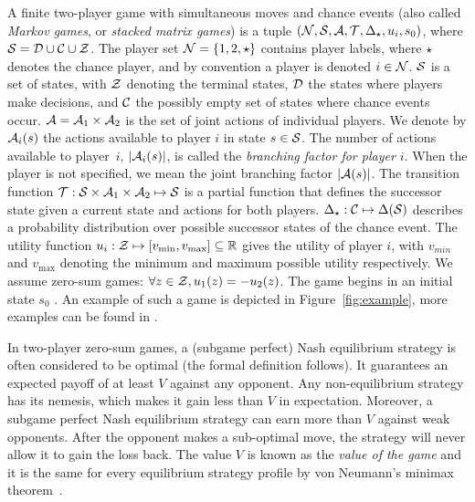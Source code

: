 A finite two-player game with simultaneous moves and chance events (also called \emph{Markov games}, or \emph{stacked matrix games}) is a tuple $(\mathcal{N}, \mathcal{S}, \mathcal{A}, \mathcal{T}, \Delta_\star, u_i, s_0)$, where $\mathcal{S} = \mathcal{D}\cup\mathcal{C}\cup\mathcal{Z}$.
The player set $\mathcal{N} = \{ 1, 2, \star \}$ contains player labels, where
$\star$ denotes the chance player, and by convention a player is denoted $i \in \mathcal{N}$.
$\mathcal{S}$ is a set of states, with $\mathcal{Z}$ denoting the terminal states, $\mathcal{D}$ the states where players make decisions,
and $\mathcal{C}$ the possibly empty set of states where chance events occur. $\mathcal{A} = \mathcal{A}_1 \times \mathcal{A}_2$ is the set of
joint actions of individual players. 
We denote by $\mathcal{A}_i(s)$ the actions available to player $i$ in state $s \in \mathcal{S}$. 
The number of actions available to player~$i$, $|\mathcal{A}_i(s)|$, is called the \emph{branching factor for player $i$}. 
When the player is not specified, we mean the joint branching factor $|\mathcal{A}(s)|$.
The transition function $\mathcal{T} : \mathcal{S} \times \mathcal{A}_1 \times \mathcal{A}_2 \mapsto \mathcal{S}$ is a partial function that defines the successor state given a current
state and actions for both players. $\Delta_\star:\mathcal{C} \mapsto \Delta(\mathcal{S})$ describes a probability distribution over
possible successor states of the chance event.
The utility function $u_i : \mathcal{Z} \mapsto [v_{\min}, v_{\max}] \subseteq \mathbb{R}$ gives the utility of player $i$, with
$v_{min}$ and $v_{\max}$ denoting the minimum and maximum possible utility respectively. We assume zero-sum
games: $\forall z \in \mathcal{Z}, u_1(z) = -u_2(z)$. 
The game begins in an initial state $s_0$ .
An example of such a game is depicted in Figure~\ref{fig:example}, more examples can be found in \cite[Chapter 5]{Saffidine2013thesis}.

In two-player zero-sum games, a (subgame perfect) Nash equilibrium strategy is often considered to be optimal (the formal definition follows).
It guarantees an expected payoff of at least $V$ against any opponent. Any non-equilibrium strategy has its nemesis, which makes it gain less
than $V$ in expectation. Moreover, a subgame perfect Nash equilibrium strategy can earn more than $V$ against weak opponents. After the
opponent makes a sub-optimal move, the strategy will never allow it to gain the loss back.
The value $V$ is known as the \emph{value of the game} and it is the same for every equilibrium strategy profile by von Neumann's minimax theorem~\cite{VonNeumann1928}.

